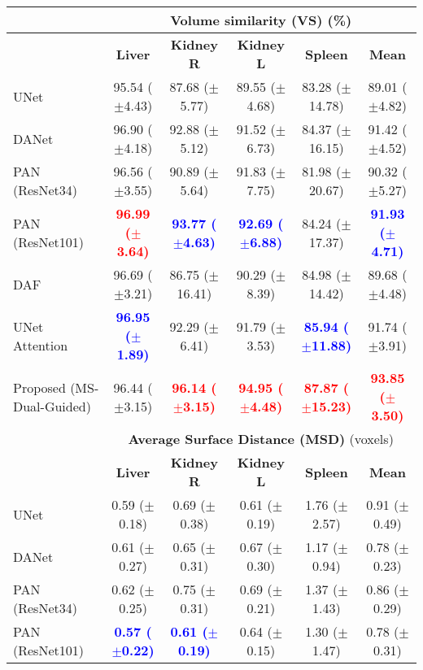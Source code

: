 \documentclass[journal]{IEEEtran}
\begin{document}
\begin{table*}[t!]
\begin{tabular}{lcccc|c}
\midrule
& \multicolumn{5}{c}{\textbf{Volume similarity (VS)} (\%)}\\
 \midrule
 & \textbf{Liver} & \textbf{Kidney R} & \textbf{Kidney L} & \textbf{Spleen} & \textbf{Mean}  \\
 \midrule
UNet \cite{ronneberger2015u}  &  95.54 ($\pm$4.43)& 87.68 ($\pm$5.77)& 89.55 ($\pm$4.68)& 83.28 ($\pm$14.78)& 89.01 ($\pm$4.82)\\
DANet \cite{fu2018dual}  &  96.90 ($\pm$4.18) & 92.88 ($\pm$5.12)& 91.52 ($\pm$6.73) & 84.37 ($\pm$16.15)& 91.42  ($\pm$4.52)   \\
PAN (ResNet34) \cite{li2018pyramid}   &  96.56 ($\pm$3.55)  & 90.89 ($\pm$5.64) & 91.83 ($\pm$7.75) & 81.98 ($\pm$20.67) & 90.32 ($\pm$5.27) \\
PAN (ResNet101) \cite{li2018pyramid}   & \textcolor{red}{\textbf{96.99 ($\pm$3.64)}}  & \textcolor{blue}{\textbf{93.77 ($\pm$4.63)}} & \textcolor{blue}{\textbf{92.69 ($\pm$6.88)}} & 84.24 ($\pm$17.37) & \textcolor{blue}{\textbf{91.93 ($\pm$4.71)}} \\
DAF \cite{wang18d}  &  96.69 ($\pm$3.21) & 86.75 ($\pm$16.41) & 90.29 ($\pm$8.39) & 84.98 ($\pm$14.42) &   89.68 ($\pm$4.48)  \\
UNet Attention \cite{schlemper2019attention}  &   \textcolor{blue}{\textbf{96.95 ($\pm$1.89)}} & 92.29 ($\pm$6.41)& 91.79 ($\pm$3.53) & \textcolor{blue}{\textbf{85.94 ($\pm$11.88)}} &  91.74 ($\pm$3.91)   \\
Proposed (MS-Dual-Guided)  &  96.44 ($\pm$3.15)  & \textcolor{red}{\textbf{96.14 ($\pm$3.15)}}& \textcolor{red}{\textbf{94.95 ($\pm$4.48)}}  & \textcolor{red}{\textbf{87.87 ($\pm$15.23)}} & \textcolor{red}{\textbf{93.85 ($\pm$3.50)}} \\
\midrule
& \multicolumn{5}{c}{\textbf{Average Surface Distance (MSD)} (voxels)}\\
 \midrule
 & \textbf{Liver} & \textbf{Kidney R} & \textbf{Kidney L} & \textbf{Spleen} & \textbf{Mean}  \\
 \midrule
UNet \cite{ronneberger2015u}  & 0.59 ($\pm$0.18)& 0.69 ($\pm$0.38)& 0.61 ($\pm$0.19)& 1.76 ($\pm$2.57)& 0.91 ($\pm$0.49) \\
DANet \cite{fu2018dual}  &  0.61 ($\pm$0.27) & 0.65 ($\pm$0.31)& 0.67 ($\pm$0.30) & 1.17 ($\pm$0.94)& 0.78  ($\pm$0.23)   \\
PAN (ResNet34)\cite{li2018pyramid}   & 0.62 ($\pm$0.25)  & 0.75 ($\pm$0.31) & 0.69 ($\pm$0.21) & 1.37 ($\pm$1.43) & 0.86 ($\pm$0.29) \\
PAN (ResNet101) \cite{li2018pyramid}   & \textcolor{blue}{\textbf{0.57 ($\pm$0.22)}}  & \textcolor{blue}{\textbf{0.61 ($\pm$0.19)}} & 0.64 ($\pm$0.15) & 1.30 ($\pm$1.47) & 0.78 ($\pm$0.31) \\

\end{tabular}
\end{table*}
\end{document}
